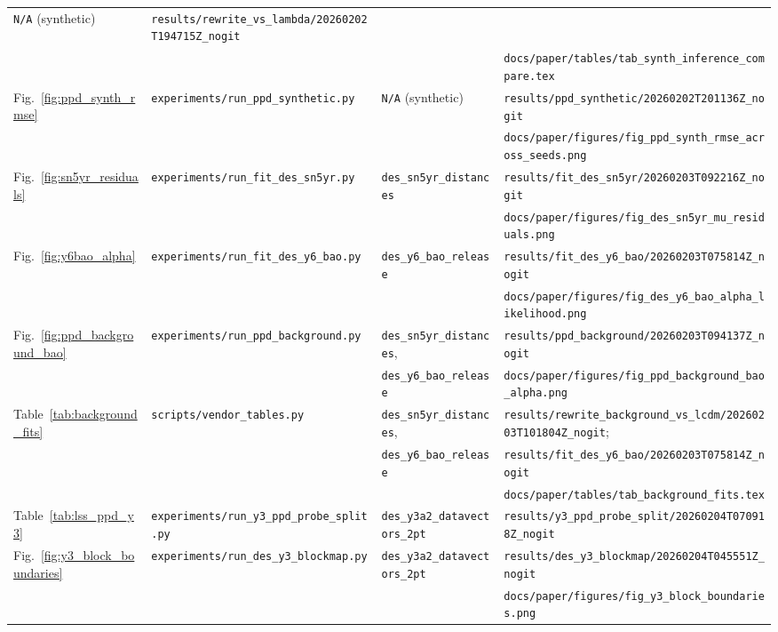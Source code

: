 \documentclass[11pt]{article}
\theoremstyle{definition}
\theoremstyle{plain}
\theoremstyle{remark}
\begin{document}
\begin{landscape}
\begin{table}[p]
\begin{tabular}{@{}llll@{}}
\texttt{N/A} (synthetic) &
\texttt{results/rewrite\_vs\_lambda/20260202T194715Z\_nogit} \\
& & &
\texttt{docs/paper/tables/tab\_synth\_inference\_compare.tex} \\[2pt]
Fig.~\ref{fig:ppd_synth_rmse} &
\texttt{experiments/run\_ppd\_synthetic.py} &
\texttt{N/A} (synthetic) &
\texttt{results/ppd\_synthetic/20260202T201136Z\_nogit} \\
& & &
\texttt{docs/paper/figures/fig\_ppd\_synth\_rmse\_across\_seeds.png} \\
\midrule
Fig.~\ref{fig:sn5yr_residuals} &
\texttt{experiments/run\_fit\_des\_sn5yr.py} &
\texttt{des\_sn5yr\_distances} &
\texttt{results/fit\_des\_sn5yr/20260203T092216Z\_nogit} \\
& & &
\texttt{docs/paper/figures/fig\_des\_sn5yr\_mu\_residuals.png} \\[2pt]
Fig.~\ref{fig:y6bao_alpha} &
\texttt{experiments/run\_fit\_des\_y6\_bao.py} &
\texttt{des\_y6\_bao\_release} &
\texttt{results/fit\_des\_y6\_bao/20260203T075814Z\_nogit} \\
& & &
\texttt{docs/paper/figures/fig\_des\_y6\_bao\_alpha\_likelihood.png} \\[2pt]
Fig.~\ref{fig:ppd_background_bao} &
\texttt{experiments/run\_ppd\_background.py} &
\texttt{des\_sn5yr\_distances}, &
\texttt{results/ppd\_background/20260203T094137Z\_nogit} \\
& &
\texttt{des\_y6\_bao\_release} &
\texttt{docs/paper/figures/fig\_ppd\_background\_bao\_alpha.png} \\[2pt]
Table~\ref{tab:background_fits} &
\texttt{scripts/vendor\_tables.py} &
\texttt{des\_sn5yr\_distances}, &
\texttt{results/rewrite\_background\_vs\_lcdm/20260203T101804Z\_nogit}; \\
& &
\texttt{des\_y6\_bao\_release} &
\texttt{results/fit\_des\_y6\_bao/20260203T075814Z\_nogit} \\
& & &
\texttt{docs/paper/tables/tab\_background\_fits.tex} \\
\midrule
Table~\ref{tab:lss_ppd_y3} &
\texttt{experiments/run\_y3\_ppd\_probe\_split.py} &
\texttt{des\_y3a2\_datavectors\_2pt} &
\texttt{results/y3\_ppd\_probe\_split/20260204T070918Z\_nogit} \\[2pt]
Fig.~\ref{fig:y3_block_boundaries} &
\texttt{experiments/run\_des\_y3\_blockmap.py} &
\texttt{des\_y3a2\_datavectors\_2pt} &
\texttt{results/des\_y3\_blockmap/20260204T045551Z\_nogit} \\
& & &
\texttt{docs/paper/figures/fig\_y3\_block\_boundaries.png} \\[2pt]

\end{tabular}
\end{table}
\end{landscape}
\end{document}
